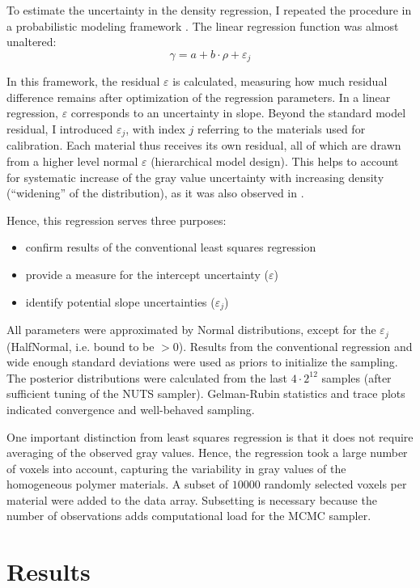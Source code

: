 To estimate the uncertainty in the density regression, I repeated the procedure in a probabilistic modeling framework \citep[PyMC, Version 5.6,][]{Salvatier2016}.
The linear regression function was almost unaltered:
\[\gamma = a+b\cdot\rho + \varepsilon_{j}\]


In this framework, the residual \(\varepsilon\) is calculated, measuring how much residual difference remains after optimization of the regression parameters.
In a linear regression, \(\varepsilon\) corresponds to an uncertainty in slope.
Beyond the standard model residual, I introduced \(\varepsilon_{j}\), with index \(j\) referring to the materials used for calibration.
Each material thus receives its own residual, all of which are drawn from a higher level normal \(\varepsilon\) (hierarchical model design).
This helps to account for systematic increase of the gray value uncertainty with increasing density (``widening'' of the distribution), as it was also observed in \citet{DuPlessis2013}.

Hence, this regression serves three purposes:
\begin{itemize}
\item confirm results of the conventional least squares regression
\item provide a measure for the intercept uncertainty (\(\varepsilon\))
\item identify potential slope uncertainties (\(\varepsilon_{j}\))
\end{itemize}


All parameters were approximated by Normal distributions, except for the \(\varepsilon_{j}\) (HalfNormal, i.e. bound to be \(>0\)).
Results from the conventional regression and wide enough standard deviations were used as priors to initialize the sampling.
The posterior distributions were calculated from the last \(4\cdot 2^{12}\) samples (after sufficient tuning of the NUTS sampler).
Gelman-Rubin statistics and trace plots indicated convergence and well-behaved sampling.


One important distinction from least squares regression is that it does not require averaging of the observed gray values.
Hence, the regression took a large number of voxels into account, capturing the variability in gray values of the homogeneous polymer materials.
A subset of \(10000\) randomly selected voxels per material were added to the data array.
Subsetting is necessary because the number of observations adds computational load for the MCMC sampler.


\section{Results}
\label{sec:org3ac3d68}
